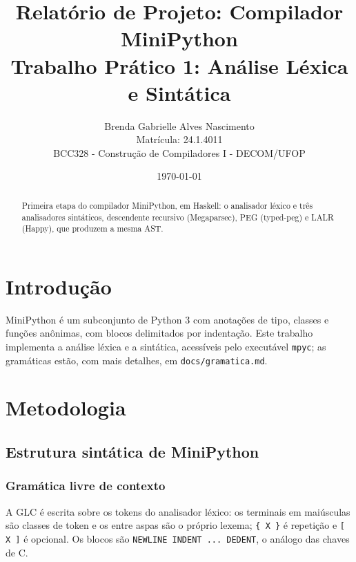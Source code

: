\documentclass[12pt,a4paper]{article}
\title{Relatório de Projeto: Compilador MiniPython\\[4pt]
\large Trabalho Prático 1: Análise Léxica e Sintática}
\author{
    Brenda Gabrielle Alves Nascimento \\
    Matrícula: 24.1.4011 \\
    BCC328 - Construção de Compiladores I - DECOM/UFOP
}
\date{\today}
\begin{document}
\maketitle

\begin{abstract}
Primeira etapa do compilador MiniPython, em Haskell: o analisador
léxico e três analisadores sintáticos, descendente recursivo
(Megaparsec), PEG (typed-peg) e LALR (Happy), que produzem a mesma AST.
\end{abstract}


\section{Introdução}

MiniPython é um subconjunto de Python 3 com anotações de tipo, classes
e funções anônimas, com blocos delimitados por indentação. Este
trabalho implementa a análise léxica e a sintática, acessíveis pelo
executável \texttt{mpyc}; as gramáticas estão, com mais detalhes, em
\texttt{docs/gramatica.md}.

\section{Metodologia}

\subsection{Estrutura sintática de MiniPython}

\subsubsection*{Gramática livre de contexto}

A GLC é escrita sobre os tokens do analisador léxico: os terminais em
maiúsculas são classes de token e os entre aspas são o próprio lexema;
\texttt{\{ X \}} é repetição e \texttt{[ X ]} é opcional. Os blocos são
\texttt{NEWLINE INDENT ... DEDENT}, o análogo das chaves de C.
\end{document}
